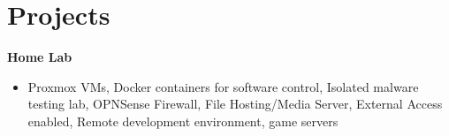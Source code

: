 \documentclass{article}
\newcommand{\topLevelProjectItem}[2]{
    \textbf{#1}\hfill \emph{#2}\newline
    \vspace{-18pt}\begin{itemize}
}
\newcommand{\topLevelItemEnd}{\end{itemize}\vspace{5pt}}
\newcommand{\lowLevelItem}[1]{
    \item\small{#1}\vspace{-8pt}
}
\begin{document}
    \section*{Projects}
        \topLevelProjectItem{Home Lab}{{}} %
            \lowLevelItem{Proxmox VMs, Docker containers for software control, Isolated malware testing lab, OPNSense Firewall, File Hosting/Media Server, External Access enabled, Remote development environment, game servers}
        \topLevelItemEnd
\end{document}
